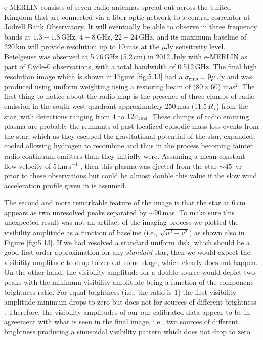 e-MERLIN \citep{muxlow_2003} consists of seven radio antennas spread out across the United Kingdom that are connected via a fiber optic network to a central correlator at Jodrell Bank Observatory. It will eventually be able to observe in three frequency bands at $1.3-1.8$\,GHz, $4-8$\,GHz, $22-24$\,GHz, and its maximum baseline of 220\,km will provide resolution up to 10\,mas at the $\mu$Jy sensitivity level. Betelgeuse was observed at 5.76\,GHz (5.2\,cm) in 2012 July with e-MERLIN as part of Cycle-0 observations, with a total bandwidth of 0.512\,GHz. The final high resolution image which is shown in Figure \ref{fig:5.13} had a $\sigma _{\rm{rms}}=9\mu$\,Jy and was produced using uniform weighting using a restoring beam of ($80\times 60$) mas$^2$. The first thing to notice about the radio map is the presence of three clumps of radio emission in the south-west quadrant approximately 250\,mas (11.5\,$R_{\star}$) from the star, with detections ranging from 4 to $12\sigma _{\rm{rms}}$. These clumps of radio emitting plasma are probably the remnants of past localized episodic mass loss events from the star, which as they escaped the gravitational potential of the star, expanded, cooled allowing hydrogen to recombine and thus in the process becoming fainter radio continuum emitters than they initially were. Assuming a mean constant flow velocity of 5\,km\,s$^{-1}$ \citep[see Figure 10 in][]{harper_2001}, then this plasma was ejected from the star $\sim 45$\, yr prior to these observations but could be almost double this value if the slow wind acceleration profile given in \cite{harper_2001} is assumed.

The second and more remarkable feature of the image is that the star at 6\,cm appears as two unresolved peaks separated by $\sim 90$\,mas. To make sure this unexpected result was not an artifact of the imaging process we plotted the visibility amplitude as a function of baseline (i.e., $\sqrt{u^2 + v^2}$) as shown also in Figure \ref{fig:5.13}. If we had resolved a standard uniform disk, which should be a good first order approximation for any \textit{standard} star, then we would expect the visibility amplitude to drop to zero at some stage, which clearly does not happen. On the other hand, the visibility amplitude for a double source would depict two peaks with the minimum visibility amplitude being a function of the component brightness ratio. For equal brightness (i.e., the ratio is 1) the first visibility amplitude minimum drops to zero but does not for sources of different brightness \citep{saha_2011}. Therefore, the visibility amplitudes of our our calibrated data appear to be in agreement with what is seen in the final image, i.e., two sources of different brightness producing a sinusoidal visibility pattern which does not drop to zero. 

